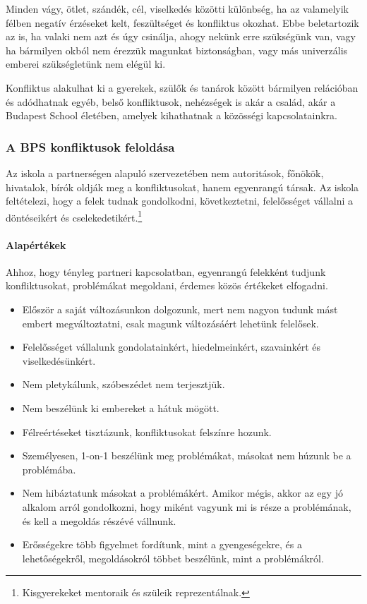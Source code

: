 Minden vágy, ötlet, szándék, cél, viselkedés közötti különbség, ha az
valamelyik
félben negatív érzéseket kelt, feszültséget és konfliktus okozhat. Ebbe
beletartozik az is, ha valaki nem
azt és úgy csinálja, ahogy nekünk erre szükségünk van, vagy ha bármilyen
okból nem érezzük magunkat biztonságban, vagy más univerzális emberei
szükségletünk \citep{rosenberg2003nonviolent} nem elégül ki.

Konfliktus alakulhat ki a gyerekek, szülők és tanárok között bármilyen
relációban és adódhatnak egyéb, belső konfliktusok, nehézségek is akár a
család, akár a Budapest School életében, amelyek kihathatnak a közösségi
kapcsolatainkra.

\subsubsection{A BPS konfliktusok feloldása}

Az iskola a partnerségen alapuló szervezetében nem autoritások, főnökök,
hivatalok, bírók oldják
meg a konfliktusokat, hanem
egyenrangú társak. Az iskola feltételezi, hogy a felek tudnak gondolkodni,
következtetni,
felelősséget vállalni a döntéseikért és cselekedetikért.\footnote{Kisgyerekeket
      mentoraik és szüleik reprezentálnak.}

\paragraph{Alapértékek}
Ahhoz, hogy tényleg partneri kapcsolatban, egyenrangú felekként tudjunk
konfliktusokat, problémákat megoldani, érdemes közös értékeket elfogadni.
\begin{itemize}
      \item Először a saját változásunkon dolgozunk, mert nem nagyon tudunk mást
            embert megváltoztatni, csak magunk változásáért
            lehetünk
            felelősek.
      \item Felelősséget vállalunk gondolatainkért, hiedelmeinkért, szavainkért
            és
            viselkedésünkért.
      \item Nem pletykálunk, szóbeszédet nem terjesztjük.
      \item Nem beszélünk ki embereket a hátuk mögött.
      \item Félreértéseket tisztázunk, konfliktusokat felszínre hozunk.
      \item Személyesen, 1-on-1 beszélünk meg problémákat, másokat nem húzunk be
            a
            problémába.
      \item Nem hibáztatunk másokat a problémákért. Amikor mégis, akkor az egy jó
            alkalom arról gondolkozni, hogy
            miként vagyunk mi is része a problémának, és kell a megoldás részévé
            vállnunk.
      \item Erősségekre több figyelmet fordítunk, mint a gyengeségekre, és a
            lehetőségekről, megoldásokról többet beszélünk, mint a problémákról.
\end{itemize}

